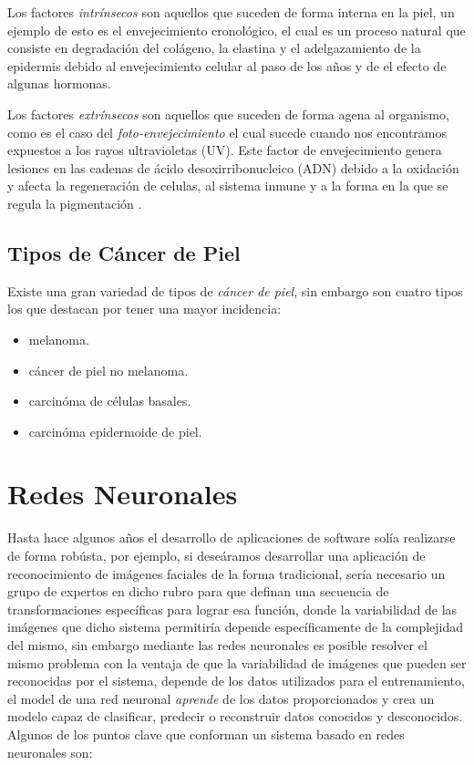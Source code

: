Los factores \emph{intrínsecos} son aquellos que suceden de forma interna en la piel, un ejemplo de esto es el envejecimiento cronológico, el cual es un proceso natural que consiste en degradación del colágeno, la elastina y el adelgazamiento de la epidermis debido al envejecimiento celular al paso de los años y de el efecto de algunas hormonas.

Los factores \emph{extrínsecos} son aquellos que suceden de forma agena al organismo, como es el caso del \emph{foto-envejecimiento} el cual sucede cuando nos encontramos expuestos a los rayos ultravioletas (UV). Este factor de envejecimiento genera lesiones en las cadenas de ácido desoxirribonucleico (ADN) debido a la oxidación y afecta la regeneración de celulas, al sistema inmune y a la forma en la que se regula la pigmentación \citep{skin_aging}.

\subsection{Tipos de Cáncer de Piel}
Existe una gran variedad de tipos de \emph{cáncer de piel}, sin embargo son cuatro tipos los que destacan por tener una mayor incidencia:

\begin{itemize}
    \item melanoma.
    \item cáncer de piel no melanoma.
    \item carcinóma de células basales.
    \item carcinóma epidermoide de piel.
\end{itemize}


\section{Redes Neuronales}

Hasta hace algunos años el desarrollo de aplicaciones de software solía realizarse de forma robústa, por ejemplo, si deseáramos desarrollar una aplicación de reconocimiento de imágenes faciales de la forma tradicional, sería necesario un grupo de expertos en dicho rubro para que definan una secuencia de transformaciones específicas para lograr esa función, donde la variabilidad de las imágenes que dicho sistema permitiría depende específicamente de la complejidad del mismo, sin embargo mediante las redes neuronales es posible resolver el mismo problema con la ventaja de que la variabilidad de imágenes que pueden ser reconocidas por el sistema, depende de los datos utilizados para el entrenamiento, el model de una red neuronal \emph{aprende} de los datos proporcionados y crea un modelo capaz de clasificar, predecir o reconstruir datos conocidos y desconocidos. Algunos de los puntos clave que conforman un sistema basado en redes neuronales son:

